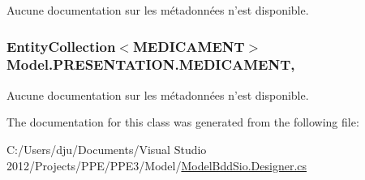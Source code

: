 Aucune documentation sur les métadonnées n'est disponible. 

\hypertarget{class_model_1_1_p_r_e_s_e_n_t_a_t_i_o_n_a0b3e3f0cdd8d574cb35b28ee097ab0af}{
\subsubsection[{M\-E\-D\-I\-C\-A\-M\-E\-N\-T}]{\setlength{\rightskip}{0pt plus 5cm}Entity\-Collection$<${\bf M\-E\-D\-I\-C\-A\-M\-E\-N\-T}$>$ Model.\-P\-R\-E\-S\-E\-N\-T\-A\-T\-I\-O\-N.\-M\-E\-D\-I\-C\-A\-M\-E\-N\-T\hspace{0.3cm}{\ttfamily [get]}, {\ttfamily [set]}}}\label{class_model_1_1_p_r_e_s_e_n_t_a_t_i_o_n_a0b3e3f0cdd8d574cb35b28ee097ab0af}


Aucune documentation sur les métadonnées n'est disponible. 



The documentation for this class was generated from the following file\-:\begin{DoxyCompactItemize}
\item 
C\-:/\-Users/dju/\-Documents/\-Visual Studio 2012/\-Projects/\-P\-P\-E/\-P\-P\-E3/\-Model/\hyperlink{_model_bdd_sio_8_designer_8cs}{Model\-Bdd\-Sio.\-Designer.\-cs}\end{DoxyCompactItemize}

